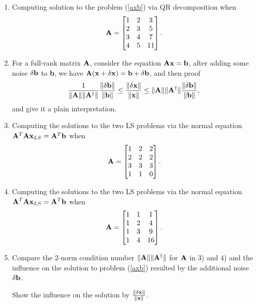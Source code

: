 \documentclass[english,onecolumn]{IEEEtran}
\begin{document}
\begin{enumerate}
    \item Computing solution to the problem (\ref{axb})
    via QR decomposition when \[{\bf A}=
    \begin{bmatrix}
    1 & 2 & 3\\
    2 & 3 & 5\\
    3 & 4 & 7\\
    4 & 5 & 11
    \end{bmatrix}. \]
    
    \item For a full-rank matrix ${\bf A}$, consider the equation ${\bf Ax=b}$, after adding some noise $\delta{\bf b}$ to {\bf b}, we have ${\bf A}({\bf x}+\delta{\bf x}) = {\bf b}+\delta{\bf b}$, 
    and then proof
    $$ \frac{1}{\|{\bf A}\| \|{\bf A}^{\dagger}\|} \frac{\|\delta {\bf b}\|}{\|{\bf b}\|}
    \leq \frac{\|\delta {\bf x}\|}{\|{\bf x}\|} \leq
    \|{\bf A}\| \|{\bf A}^{\dagger}\|\frac{\|\delta {\bf b}\|}{\|{\bf b}\|}, $$
    and give it a plain interpretation.
    
    \item Computing the solutions to the two LS problems via the normal equation $ {\bf A}^T{\bf A}{\bf x}_{LS} = {\bf A}^T {\bf b} $ when \[{\bf A}=\begin{bmatrix}
    1 & 2 & 2\\
    2 & 2 & 2\\
    3 & 3 & 3\\
    1 & 1 & 0
    \end{bmatrix}.  \]
    
    \item Computing the solutions to the two LS problems via the normal equation $ {\bf A}^T{\bf A}{\bf x}_{LS} = {\bf A}^T {\bf b} $ when \[ {\bf A} = \begin{bmatrix}
    1 & 1 & 1\\
    1 & 2 & 4\\
    1 & 3 & 9\\
    1 & 4 & 16
    \end{bmatrix}. \]
    
    \item 
    Compare the 2-norm condition number $\|{\bf A}\|\| {\bf A}^{\dagger}\|$ for ${\bf A}$ in 3) and 4) and the influence on the solution to problem (\ref{axb}) 
    resulted by the additional noise $\delta{\bf b}$.
    
     Show the influence on the solution  by $\frac{\|\delta {\bf x}\|}{\|{\bf x}\|}$.
\end{enumerate}
\end{document}
